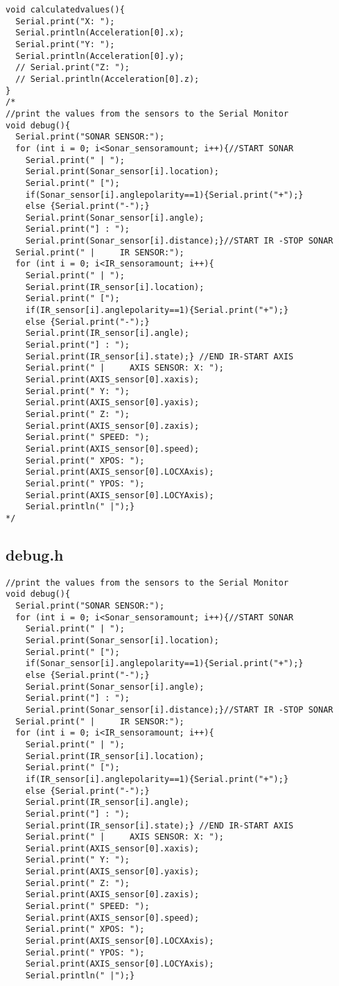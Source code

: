 \begin{lstlisting}
void calculatedvalues(){
  Serial.print("X: ");
  Serial.println(Acceleration[0].x);
  Serial.print("Y: ");
  Serial.println(Acceleration[0].y);
  // Serial.print("Z: ");
  // Serial.println(Acceleration[0].z);
}
/*
//print the values from the sensors to the Serial Monitor
void debug(){ 
  Serial.print("SONAR SENSOR:");
  for (int i = 0; i<Sonar_sensoramount; i++){//START SONAR
    Serial.print(" | ");
    Serial.print(Sonar_sensor[i].location);
    Serial.print(" [");
    if(Sonar_sensor[i].anglepolarity==1){Serial.print("+");}
    else {Serial.print("-");}
    Serial.print(Sonar_sensor[i].angle);
    Serial.print("] : ");
    Serial.print(Sonar_sensor[i].distance);}//START IR -STOP SONAR
  Serial.print(" |     IR SENSOR:");
  for (int i = 0; i<IR_sensoramount; i++){
    Serial.print(" | ");
    Serial.print(IR_sensor[i].location);
    Serial.print(" [");
    if(IR_sensor[i].anglepolarity==1){Serial.print("+");}
    else {Serial.print("-");}
    Serial.print(IR_sensor[i].angle);
    Serial.print("] : ");
    Serial.print(IR_sensor[i].state);} //END IR-START AXIS
    Serial.print(" |     AXIS SENSOR: X: ");
    Serial.print(AXIS_sensor[0].xaxis);
    Serial.print(" Y: ");
    Serial.print(AXIS_sensor[0].yaxis);
    Serial.print(" Z: ");
    Serial.print(AXIS_sensor[0].zaxis);
    Serial.print(" SPEED: ");
    Serial.print(AXIS_sensor[0].speed);
    Serial.print(" XPOS: ");
    Serial.print(AXIS_sensor[0].LOCXAxis);
    Serial.print(" YPOS: ");
    Serial.print(AXIS_sensor[0].LOCYAxis);
    Serial.println(" |");}
*/    
\end{lstlisting}
\subsection{debug.h}
\begin{lstlisting}
//print the values from the sensors to the Serial Monitor
void debug(){ 
  Serial.print("SONAR SENSOR:");
  for (int i = 0; i<Sonar_sensoramount; i++){//START SONAR
    Serial.print(" | ");
    Serial.print(Sonar_sensor[i].location);
    Serial.print(" [");
    if(Sonar_sensor[i].anglepolarity==1){Serial.print("+");}
    else {Serial.print("-");}
    Serial.print(Sonar_sensor[i].angle);
    Serial.print("] : ");
    Serial.print(Sonar_sensor[i].distance);}//START IR -STOP SONAR
  Serial.print(" |     IR SENSOR:");
  for (int i = 0; i<IR_sensoramount; i++){
    Serial.print(" | ");
    Serial.print(IR_sensor[i].location);
    Serial.print(" [");
    if(IR_sensor[i].anglepolarity==1){Serial.print("+");}
    else {Serial.print("-");}
    Serial.print(IR_sensor[i].angle);
    Serial.print("] : ");
    Serial.print(IR_sensor[i].state);} //END IR-START AXIS
    Serial.print(" |     AXIS SENSOR: X: ");
    Serial.print(AXIS_sensor[0].xaxis);
    Serial.print(" Y: ");
    Serial.print(AXIS_sensor[0].yaxis);
    Serial.print(" Z: ");
    Serial.print(AXIS_sensor[0].zaxis);
    Serial.print(" SPEED: ");
    Serial.print(AXIS_sensor[0].speed);
    Serial.print(" XPOS: ");
    Serial.print(AXIS_sensor[0].LOCXAxis);
    Serial.print(" YPOS: ");
    Serial.print(AXIS_sensor[0].LOCYAxis);
    Serial.println(" |");}
\end{lstlisting}
